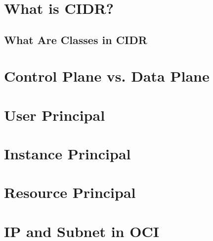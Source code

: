 \documentclass[../main.tex]{subfiles}
\begin{document}
\section{What is CIDR?}
\subsection{What Are Classes in CIDR}
\section{Control Plane vs. Data Plane}
\section{User Principal}
\section{Instance Principal}
\section{Resource Principal}
\section{IP and Subnet in OCI}

\end{document}
